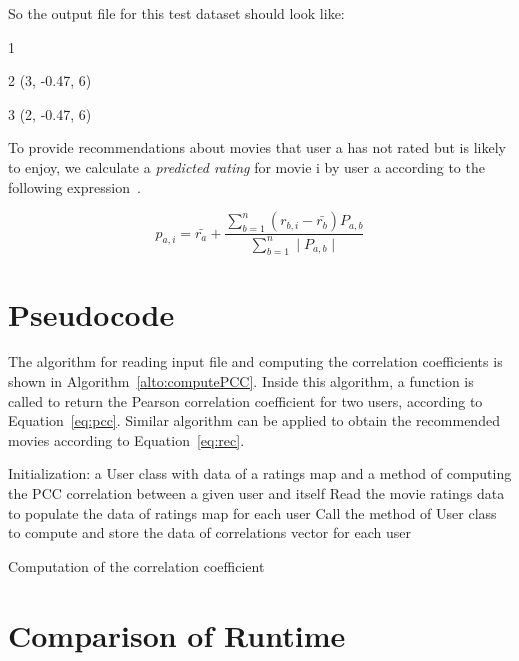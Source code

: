 \documentclass{article}
\begin{document}
\begin{flushleft}
So the output file for this test dataset should look like:

\begin{center}
1

2 (3, -0.47, 6)

3 (2, -0.47, 6)
\end{center}
\vspace{5 mm}
To provide recommendations about movies that user a has not rated but is likely to enjoy, we calculate a \emph{predicted rating} for movie i by user a according to the following expression~\cite{CME211:2013:FinalProjectPart2}.

\begin{equation}
p_{a,i} = \bar{r_a} + \frac{\sum\limits_{b=1}^{n}(r_{b,i}-\bar{r_b})P_{a,b}}{\sum\limits_{b=1}^{n}\mid P_{a,b}\mid} 
\label{eq:rec}
\end{equation}

\section{Pseudocode}

The algorithm for reading input file and computing the correlation coefficients is shown in Algorithm~\ref{alto:computePCC}. Inside this algorithm, a function is called to return the Pearson correlation coefficient for two users, according to Equation~\ref{eq:pcc}. Similar algorithm can be applied to obtain the recommended movies according to Equation~\ref{eq:rec}. 

\begin{algorithm}
 \SetAlgoLined
 Initialization: a User class with data of a ratings map and a method of computing the PCC correlation between a given user and itself\;
 Read the movie ratings data to populate the data of ratings map for each user\;
  {
       {
             Call the method of User class to compute and store the data of correlations vector for each user
      }
 }
 \caption{Computation of the correlation coefficient}
 \label{alto:computePCC}
\end{algorithm}
\vspace{5 mm}
\section{Comparison of Runtime}


\end{flushleft}
\end{document}

